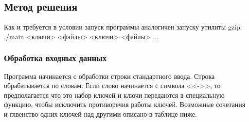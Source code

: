 \documentclass[12pt]{article}
\begin{document}
\subsection*{Метод решения}

Как и требуется в условии запуск программы аналогичен запуску утилиты gzip: ./main <ключи> <файлы> <ключи> <файлы> ...

\subsubsection*{Обработка входных данных}

Программа начинается с обработки строки стандартного ввода. Строка обрабатывается по словам. Если слово начинается с символа <<->>, то предполагается что это набор ключей и ключи передаются в специальную функцию, чтобы исключить противоречия работы ключей. Возможные сочетания и глвенство одних ключей над другими описано в таблице ниже.
\end{document}
